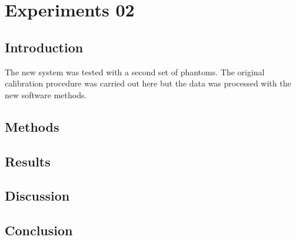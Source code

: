 \chapter{Experiments 02}
\label{chapterlabel}


\section{Introduction}
The new system was tested with a second set of phantoms. The original calibration procedure was carried out here but the data was processed with the new software methods.
\section{Methods}

\section{Results}

\section{Discussion}

\section{Conclusion}